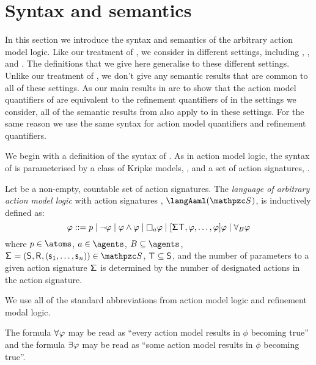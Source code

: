 \section{Syntax and semantics}\label{aaml-semantics}

In this section we introduce the syntax and semantics of the arbitrary action model logic.
Like our treatment of \logicRml{}, we consider \logicAaml{} in different settings, including \classK{}, \classKFF{}, and \classS{}.
The definitions that we give here generalise to these different settings.
Unlike our treatment of \logicRml{}, we don't give any semantic results that are common to all of these settings.
As our main results in \logicAaml{} are to show that the action model quantifiers of \logicAaml{} are equivalent to the refinement quantifiers of \logicRml{} in the settings we consider, all of the semantic results from \logicRml{} also apply to \logicAaml{} in these settings.
For the same reason we use the same syntax for action model quantifiers and refinement quantifiers.

We begin with a definition of the syntax of \logicAaml{}.
As in action model logic, the syntax of \logicAaml{} is parameterised by a class of Kripke models, \classC{}, and a set of action signatures, \aSignatureFamily{}.

\begin{definition}
Let \aSignatureFamily{} be a non-empty, countable set of action signatures.
The {\em language of arbitrary action model logic} with action signatures \aSignatureFamily{}, $\langAaml(\aSignatureFamily)$, is inductively defined as:
$$
\phi ::= 
    \atomP \mid
    \lnot \phi \mid
    \phi \land \phi \mid
    \necessaryA \phi \mid
    \actionA{\aSignature \aStatesT, \phi, \dots, \phi} \phi \mid
    \allactsBs \phi
$$
where $\atomP \in \atoms$, $\agentA \in \agents$, $\agentsB \subseteq \agents$, $\aSignatureAndTuple \in \aSignatureFamily$, $\aStatesT \subseteq \aStates$, and the number of parameters to a given action signature $\aSignature$ is determined by the number of designated actions in the action signature.
\end{definition}

We use all of the standard abbreviations from action model logic and refinement modal logic.

The formula $\allacts \phi$ may be read as ``every action model results in $\phi$ becoming true'' and the formula $\someacts \phi$ may be read as ``some action model results in $\phi$ becoming true''.

